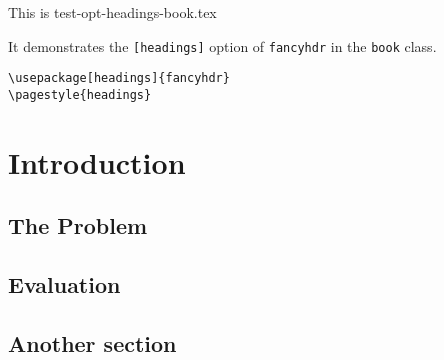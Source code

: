 \documentclass[openany]{book}
\begin{document}
\tableofcontents

\bigskip

\noindent
\begin{boxedminipage}{\textwidth}
  This is test-opt-headings-book.tex

  It demonstrates the \texttt{[headings]} option of \texttt{fancyhdr} in
  the \texttt{book} class.

\begin{verbatim}
\usepackage[headings]{fancyhdr}
\pagestyle{headings}
\end{verbatim}
\end{boxedminipage}

\chapter{Introduction}

\lipsum

\section{The Problem}
\label{sec:problem}

\lipsum[1]

\section{Evaluation}

\lipsum[2-4]

\section{Another section}

\lipsum[3]
\end{document}
